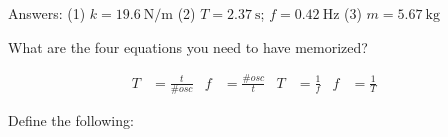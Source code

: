 \documentclass[10pt]{exam}
\begin{document}
\begin{questions}
\ifprintanswers
\else
  \begin{EnvUplevel}
    \noindent
    {\small Answers: 
      (1) $k=\SI{19.6}{\newton\per\meter}$ 
      (2) $T=\SI{2.37}{\second}$; $f=\SI{0.42}{\hertz}$
      (3) $m=\SI{5.67}{\kilo\gram}$
    }
  \end{EnvUplevel}
\fi

\pagebreak

\question
  What are the four equations you need to have memorized?

  \begin{solution}[\stretch{2}]
    \begin{align*}
      T &= \frac{t}{\#osc} &
      f &= \frac{\#osc}{t} &
      T &= \frac{1}{f} &
      f &= \frac{1}{T} &
    \end{align*}
  \end{solution}

\question
  Define the following:

\end{questions}
\end{document}
